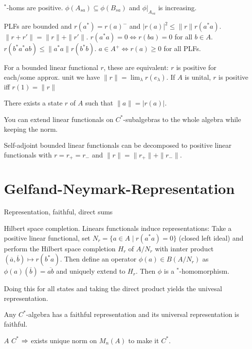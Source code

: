 \documentclass[a4paper, twocolumn, 10pt]{article}
\begin{document}
\begin{theorem}
    $^*$-homs are positive. $\phi(A_{sa}) \subseteq \phi(B_{sa})$ and $\phi|_{A_{sa}}$ is increasing.
\end{theorem}

\begin{theorem}
    PLFs are bounded and $r(a^*) = r(a)^-$ and $|r(a)|^2 \leq \|r\| r(a^* a)$.
    $\|r + r'\| = \|r\| + \|r'\|$.
    $r(a^* a) = 0 \iff r(ba) = 0$ for all $b \in A$.
    $r(b^* a^* ab) \leq \|a^*a\| r(b^*b)$.
    $a \in A^+ \iff r(a) \geq 0$ for all PLFs. 
\end{theorem}

\begin{theorem}
    For a bounded linear functional $r$, these are equivalent: $r$ is positive for each/some approx. unit we have $\|r\| = \lim_\lambda r(e_\lambda)$.
    If $A$ is unital, $r$ is positive iff $r(1) = \|r\|$ 
\end{theorem}

\begin{theorem}
    There exists a state $r$ of $A$ such that $\|a\| = |r(a)|$.
\end{theorem}

\begin{theorem}
    You can extend linear functionals on $C^*$-subalgebras to the whole algebra while keeping the norm.
\end{theorem}

\begin{theorem}
    Self-adjoint bounded linear functionals can be decomposed to positive linear functionals with $r = r_+ = r_-$ and $\|r\| = \|r_+\| + \|r_-\|$.
\end{theorem}

\section{Gelfand-Neymark-Representation}

\begin{definition}
    Representation, faithful, direct sums
\end{definition}

\begin{theorem}
    Hilbert space completion.
    Linears functionals induce representations: Take a positive linear functional, set $N_r = \{ a \in A \mid r(a^* a) = 0\}$ (closed left ideal) and perform the Hilbert space completion $H_r$ of $A/N_r$ with innter product $(\overline{a}, \overline{b}) \mapsto r(b^* a)$.
    Then define an operator $\phi(a) \in B(A/N_r)$ as $\phi(a)(\overline{b}) = \overline{ab}$ and uniquely extend to $H_r$. Then $\phi$ is a $^*$-homomorphism.

    Doing this for all states and taking the direct product yields the univesal representation.

    Any $C^*$-algebra has a faithful representation and its universal representation is faithful.
\end{theorem}

\begin{theorem}
    $A$ $C^*$ $\Rightarrow$ exists unique norm on $M_n(A)$ to make it $C^*$.
\end{theorem}
\end{document}
